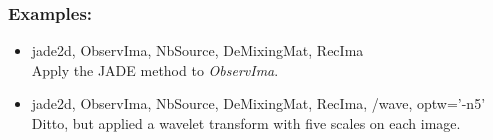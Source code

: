 \subsubsection*{Examples:}
\begin{itemize}
\item jade2d,  ObservIma, NbSource, DeMixingMat, RecIma \\
Apply the JADE method to {\em ObservIma}. 
\item jade2d, ObservIma, NbSource, DeMixingMat, RecIma, /wave, optw='-n5'\\
Ditto, but applied a wavelet transform with five scales on each image.
\end{itemize}
